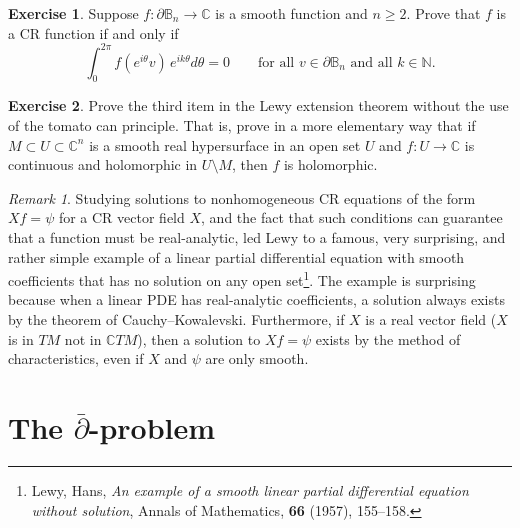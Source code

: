 \documentclass[12pt,openany]{book}
\newcommand{\C}{{\mathbb{C}}}
\newcommand{\N}{{\mathbb{N}}}
\newcommand{\bB}{{\mathbb{B}}}
\theoremstyle{plain}
\theoremstyle{remark}
\newtheorem{remark}[thm]{Remark}
\theoremstyle{definition}
\newenvironment{exbox}{%
    \def\FrameCommand{\vrule width 1pt \relax\hspace{10pt}}%
    \MakeFramed{\advance\hsize-\width\FrameRestore}%
}{%
    \endMakeFramed
}
\theoremstyle{exercise}
\newtheorem{exercise}{Exercise}[section]
\theoremstyle{example}
\begin{document}
\begin{exbox}
\begin{exercise}
Suppose $f \colon \partial \bB_n \to \C$ is a smooth function and $n \geq 2$.
Prove that $f$ is a CR function if and only if
\begin{equation*}
\int_0^{2\pi} f(e^{i\theta}v) \, e^{ik\theta} d\theta = 0
\qquad
\text{for all $v \in \partial \bB_n$ and all $k \in \N$.}
\end{equation*}
\end{exercise}

\begin{exercise}
Prove the third item in the Lewy extension theorem without the use
of the tomato can principle.  That is, prove in a more elementary
way that if $M \subset U \subset \C^n$ is a smooth real hypersurface
in an open set $U$ and $f \colon U \to \C$ is continuous
and holomorphic in $U \setminus M$, then $f$ is holomorphic.
\end{exercise}
\end{exbox}

\begin{remark}
Studying solutions to nonhomogeneous CR equations of the form $X f = \psi$
for a CR vector field $X$,
and the fact that such conditions can guarantee
that a function must be real-analytic, led Lewy to a famous, very
surprising, and rather simple
example of a
linear partial differential equation with smooth coefficients
that has no solution on any open set\footnote{%
Lewy, Hans, \emph{An example of a smooth linear partial differential
equation without solution}, Annals of Mathematics, \textbf{66} (1957), 155--158.}.
The example is surprising because when a linear PDE has real-analytic
coefficients, a solution always exists by the theorem of Cauchy--Kowalevski.
Furthermore, if $X$ is a real vector field ($X$ is in $TM$ not in $\C TM$),
then a solution to $Xf = \psi$ exists by the method of characteristics, even
if $X$ and $\psi$ are only smooth.
\end{remark}


\chapter{The \texorpdfstring{$\bar{\partial}$}{dbar}-problem} \label{ch:dbar}
\end{document}
